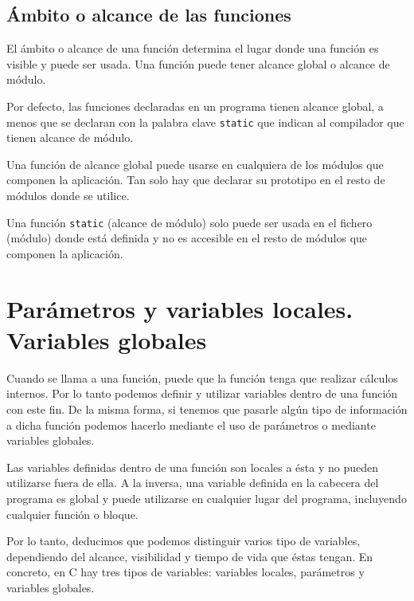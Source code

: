 \subsection{Ámbito o alcance de las funciones}{
El ámbito o alcance de una función determina el lugar donde una función es visible y puede ser usada. Una función puede tener alcance global o alcance de módulo.

Por defecto, las funciones declaradas en un programa tienen alcance global, a menos que se declaran con la palabra clave \texttt{static} que indican al compilador que tienen alcance de módulo.

Una función de alcance global puede usarse en cualquiera de los módulos que componen la aplicación. Tan solo hay que declarar su prototipo en el resto de módulos donde se utilice.

Una función \texttt{static} (alcance de módulo) solo puede ser usada en el fichero (módulo) donde está definida y no es accesible en el resto de módulos que componen la aplicación.
}
\section{Parámetros y variables locales. Variables globales}
Cuando se llama a una función, puede que la función tenga que realizar cálculos internos. Por lo tanto podemos definir y utilizar variables dentro de una función con este fin. De la misma forma, si tenemos que pasarle algún tipo de información a dicha función podemos hacerlo mediante el uso de parámetros o mediante variables globales.

Las variables definidas dentro de una función son locales a ésta y no pueden utilizarse fuera de ella. A la inversa, una variable definida en la cabecera del programa es global y puede utilizarse en cualquier lugar del programa, incluyendo cualquier función o bloque.

Por lo tanto, deducimos que podemos distinguir varios tipo de variables, dependiendo del alcance, visibilidad y tiempo de vida que éstas tengan. En concreto, en C hay tres tipos de variables: variables locales, parámetros y variables globales.
